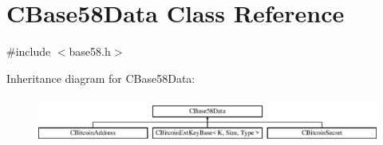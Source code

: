 \hypertarget{class_c_base58_data}{}\section{C\+Base58\+Data Class Reference}
\label{class_c_base58_data}


{\ttfamily \#include $<$base58.\+h$>$}

Inheritance diagram for C\+Base58\+Data\+:\begin{figure}[H]
\begin{center}
\leavevmode
\includegraphics[height=1.581921cm]{class_c_base58_data}
\end{center}
\end{figure}
